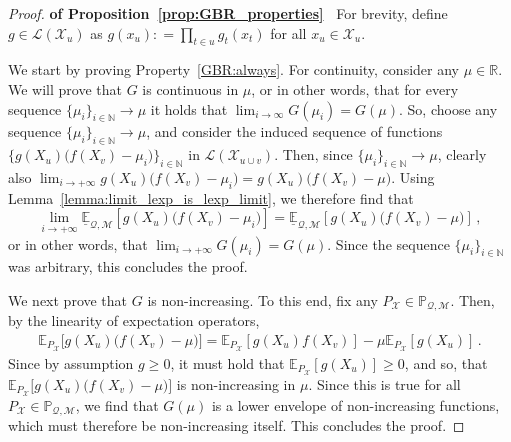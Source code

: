 \documentclass[twoside,11pt]{article}
\newcommand{\nats}{\mathbb{N}}
\newcommand{\reals}{\mathbb{R}}
\newcommand{\states}{\mathcal{X}}
\newcommand{\lexp}{\underline{\mathbb{E}}_{\rateset,\mathcal{M}}}
\newcommand{\gambles}{\mathcal{L}}
\newcommand{\rateset}{\mathcal{Q}}
\newcommand{\coloneqq}{:\!=}
\begin{document}
\begin{proof}{\bf of Proposition~\ref{prop:GBR_properties}~}
For brevity, define $g\in\gambles(\states_u)$ as $g(x_u)\coloneqq \prod_{t\in u} g_{t}(x_{t})$ for all $x_u\in\states_u$.

We start by proving Property~\ref{GBR:always}. For continuity, consider any $\mu\in\reals$. We will prove that $G$ is continuous in $\mu$, or in other words, that for every sequence $\{\mu_i\}_{i\in\nats}\to\mu$ it holds that $\lim_{i\to\infty}G(\mu_i)=G(\mu)$. So, choose any sequence $\{\mu_i\}_{i\in\nats}\to\mu$, and consider the induced sequence of functions $\bigl\{g(X_u)\bigl(f(X_v) - \mu_i\bigr)\bigr\}_{i\in\nats}$ in $\gambles(\states_{u\cup v})$. Then, since $\{\mu_i\}_{i\in\nats}\to\mu$, clearly also $\lim_{i\to+\infty}g(X_u)\bigl(f(X_v) - \mu_i\bigr)=g(X_u)\bigl(f(X_v) - \mu\bigr)$. Using Lemma~\ref{lemma:limit_lexp_is_lexp_limit}, we therefore find that
\begin{equation*}
\lim_{i\to+\infty}\lexp[g(X_u)\bigl(f(X_v) - \mu_i\bigr)] = \lexp[g(X_u)\bigl(f(X_v) - \mu\bigr)]\,,
\end{equation*}
or in other words, that $\lim_{i\to+\infty}G(\mu_i) = G(\mu)$. Since the sequence $\{\mu_i\}_{i\in\nats}$ was arbitrary, this concludes the proof.

We next prove that $G$ is non-increasing. To this end, fix any $P_\states\in\mathbb{P}_{\rateset,\mathcal{M}}$. Then, by the linearity of expectation operators,
\begin{align}\label{eq:gbr_linear_expansion}
\mathbb{E}_{P_\states}\bigl[g(X_u)\bigl(f(X_v) - \mu\bigr)\bigr] = \mathbb{E}_{P_\states}[g(X_u)f(X_v)] - \mu\mathbb{E}_{P_\states}[g(X_u)]\,.
\end{align}
Since by assumption $g\geq 0$, it must hold that $\mathbb{E}_{P_\states}[g(X_u)]\geq 0$, and so, that $\mathbb{E}_{P_\states}\bigl[g(X_u)\bigl(f(X_v) - \mu\bigr)\bigr]$ is non-increasing in $\mu$. Since this is true for all ${P_\states}\in\mathbb{P}_{\rateset,\mathcal{M}}$, we find that $G(\mu)$ is a lower envelope of non-increasing functions, which must therefore be non-increasing itself. This concludes the proof.


\end{proof}
\end{document}
